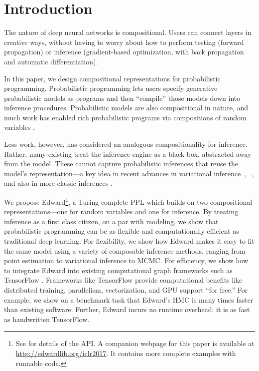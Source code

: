 \vspace{-1.0ex}
\section{Introduction}
\label{sec:introduction}
\vspace{-0.5ex}
The nature of deep neural networks is compositional. Users can connect
layers in creative ways, without having to worry about how to perform
testing (forward propagation) or inference (gradient-based
optimization, with back propagation and automatic differentiation).

In this paper, we design compositional representations for
probabilistic programming.  Probabilistic programming lets users
specify generative probabilistic models as programs and then
``compile'' those models down into inference procedures.
Probabilistic models are also compositional in nature, and much work
has enabled rich probabilistic programs via compositions of random
variables
\citep{goodman2012church,ghahramani2015probabilistic,lake2016building}.

Less work, however, has considered an analogous compositionality for
inference. Rather, many existing  treat
the inference engine as a black box, abstracted away from the model.
These cannot capture probabilistic inferences that
reuse the model's representation---a key idea in
recent advances in variational
inference~\citep{kingma2014autoencoding,rezende2015variational,tran2016variational},
~\citep{goodfellow2014generative},
and also in more classic inferences
\citep{dayan1995helmholtz,gutmann2010noise}.

We propose Edward\footnote{%
  See \citet{tran2016edward}
  for details of the API. A companion webpage for this paper is available at
  \url{http://edwardlib.org/iclr2017}. It contains more complete
  examples with runnable code.}, a
Turing-complete \acrlong{PPL} which builds on two compositional
representations---one for random variables and one for inference.
By treating inference as a first class citizen, on a
par with modeling, we show that probabilistic programming can be as
flexible and computationally efficient as traditional deep learning.
For flexibility, we show how Edward makes it easy to fit
the same model using a variety of composable inference methods,
ranging from point estimation to variational inference to
\acrshort{MCMC}.
For efficiency, we
show how to integrate Edward into existing computational graph
frameworks such as TensorFlow \citep{abadi2016tensorflow}.  Frameworks
like TensorFlow provide computational benefits like distributed
training, parallelism, vectorization, and \gls{GPU}
support ``for free.''
For example, we show on a benchmark task that Edward's
\acrlong{HMC} is many times faster than existing software. Further, Edward
incurs no runtime overhead: it is as fast as handwritten TensorFlow.

